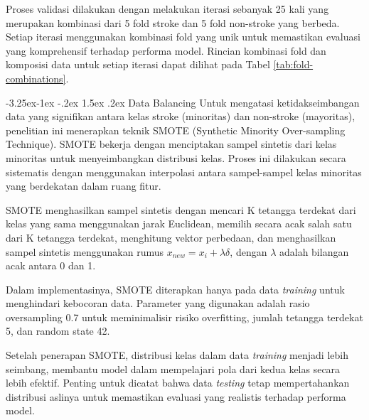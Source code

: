 \documentclass[10pt]{article}
\makeatletter
\renewcommand\subsubsection{\@startsection{subsubsection}{3}{\z@}%
  {-3.25ex\@plus -1ex \@minus -.2ex}%
  {1.5ex \@plus .2ex}%
  {\normalfont\itshape\normalsize}}
\makeatother
\begin{document}
\begin{multicols}{2}
    Proses validasi dilakukan dengan melakukan iterasi sebanyak 25 kali yang
    merupakan kombinasi dari 5 fold stroke dan 5 fold non-stroke yang berbeda.
    Setiap iterasi menggunakan kombinasi fold yang unik untuk memastikan evaluasi
    yang komprehensif terhadap performa model. Rincian kombinasi fold dan komposisi
    data untuk setiap iterasi dapat dilihat pada Tabel \ref{tab:fold-combinations}.

    \subsubsection{Data Balancing}
    Untuk mengatasi ketidakseimbangan data yang signifikan antara kelas stroke
    (minoritas) dan non-stroke (mayoritas), penelitian ini menerapkan teknik SMOTE
    (Synthetic Minority Over-sampling Technique). SMOTE bekerja dengan menciptakan
    sampel sintetis dari kelas minoritas untuk menyeimbangkan distribusi kelas.
    Proses ini dilakukan secara sistematis dengan menggunakan interpolasi antara
    sampel-sampel kelas minoritas yang berdekatan dalam ruang fitur.

    SMOTE menghasilkan sampel sintetis dengan mencari K tetangga terdekat dari
    kelas yang sama menggunakan jarak Euclidean, memilih secara acak salah satu
    dari K tetangga terdekat, menghitung vektor perbedaan, dan menghasilkan sampel
    sintetis menggunakan rumus $x_{new} = x_i + \lambda\delta$, dengan $\lambda$
    adalah bilangan acak antara 0 dan 1.

    Dalam implementasinya, SMOTE diterapkan hanya pada data \textit{training} untuk
    menghindari kebocoran data. Parameter yang digunakan adalah rasio oversampling
    0.7 untuk meminimalisir risiko overfitting, jumlah tetangga terdekat 5, dan
    random state 42.

    Setelah penerapan SMOTE, distribusi kelas dalam data \textit{training} menjadi
    lebih seimbang, membantu model dalam mempelajari pola dari kedua kelas secara
    lebih efektif. Penting untuk dicatat bahwa data \textit{testing} tetap
    mempertahankan distribusi aslinya untuk memastikan evaluasi yang realistis
    terhadap performa model.


\end{multicols}
\end{document}
